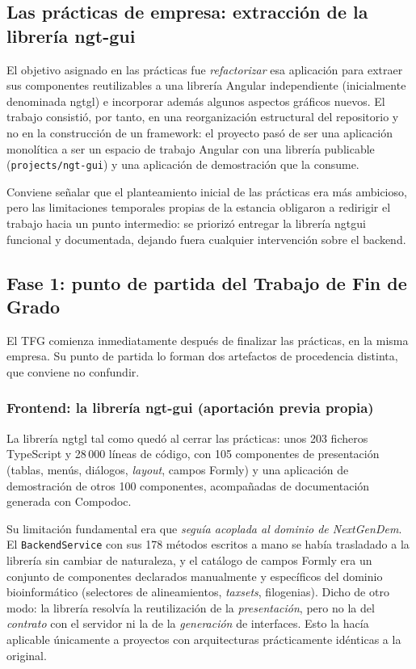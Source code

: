 \subsection{Las prácticas de empresa: extracción de la librería ngt-gui}
El objetivo asignado en las prácticas fue \emph{refactorizar} esa aplicación
para extraer sus componentes reutilizables a una librería Angular independiente
(inicialmente denominada \gls{ngtgl}) e incorporar
además algunos aspectos gráficos nuevos. El trabajo consistió, por tanto, en
una reorganización estructural del repositorio y no en la construcción de un
framework: el proyecto pasó de ser una aplicación monolítica a ser un espacio
de trabajo Angular con una librería publicable (\texttt{projects/ngt-gui}) y
una aplicación de demostración que la consume.

Conviene señalar que el planteamiento inicial de las prácticas era más
ambicioso, pero las limitaciones temporales propias de la estancia obligaron a
redirigir el trabajo hacia un punto intermedio: se priorizó entregar la librería
\gls{ngtgui} funcional y documentada, dejando fuera cualquier intervención
sobre el backend.

\subsection{Fase 1: punto de partida del Trabajo de Fin de Grado}
El TFG comienza inmediatamente después de finalizar las prácticas, en la misma
empresa. Su punto de partida lo forman dos artefactos de procedencia distinta,
que conviene no confundir.

\subsubsection{Frontend: la librería ngt-gui (aportación previa propia)}
La librería \gls{ngtgl} tal como quedó al cerrar las prácticas: unos 203
ficheros TypeScript y 28\,000 líneas de código, con 105 componentes de
presentación (tablas, menús, diálogos, \emph{layout}, campos Formly) y una
aplicación de demostración de otros 100 componentes, acompañadas de
documentación generada con Compodoc.

Su limitación fundamental era que \emph{seguía acoplada al dominio de
NextGenDem}. El \texttt{Backend\allowbreak Service} con sus 178 métodos
escritos a mano se había trasladado a la librería sin cambiar de naturaleza, y
el catálogo de campos Formly era un conjunto de componentes declarados
manualmente y específicos del dominio bioinformático (selectores de
alineamientos, \emph{taxsets}, filogenias). Dicho de otro modo: la librería
resolvía la reutilización de la \emph{presentación}, pero no la del
\emph{contrato} con el servidor ni la de la \emph{generación} de interfaces.
Esto la hacía aplicable únicamente a proyectos con arquitecturas prácticamente
idénticas a la original.

